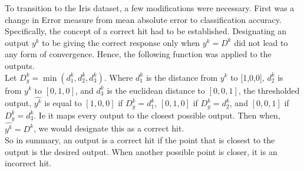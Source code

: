 \documentclass[epsfig]{article}
\begin{document}
 To transition to the Iris dataset, a few modifications were necessary. First was a change in Error measure from mean absolute error to classification accuracy. Specifically, the concept of a correct hit had to be established. Designating an output $y^k$ to be giving the correct response only when $y^k = D^k$ did not lead to any form of convergence. Hence, the following function was applied to the outputs. \\
 \newline
 Let $D_y^k = \min (d_1^k, d_2^k, d_3^k)$. Where $d_1^k$ is the distance from $y^k$ to [1,0,0], $d_2^k$ is from $y^k$ to $[0,1,0]$, and $d_3 ^ k$ is the euclidean distance to $[0,0,1]$, the thresholded output, $\hat{y^k}$ is equal to $[1,0,0]$ if $D_y^k = d_1 ^k$, $[0,1,0]$ if $D_y^k = d_2 ^k$, and $[0,0,1]$ if $D_y^k = d_3 ^k$. Ie it maps every output to the closest possible output. Then when, $\hat{y^k} = D^k$, we would designate this as a correct hit.\\
 \newline
 So in summary, an output is a correct hit if the point that is closest to the output is the desired output. When another possible point is closer, it is an incorrect hit.\\
 \newline
\end{document}
